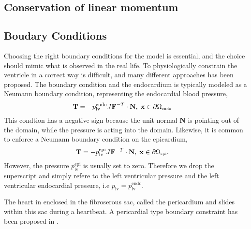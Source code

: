 

\subsection{Conservation of linear momentum}


\subsection{Boudary Conditions}
\label{sec:mech_boudary}
Choosing the right boundary conditions for the model is essential,
and the choice should mimic what is observed in the real life. To
physiologically constrain the ventricle in a correct way is difficult,
and many different approaches has been proposed.
The boundary condition and the endocardium is typically modeled as a
Neumann boundary condition, representing the endocardial blood
pressure,
\begin{align}
  \mathbf{T} &= -p_{\mathrm{lv}}^{\mathrm{endo}} J\mathbf{F}^{-T} \cdot \mathbf{N}, \;  \mathbf{x} \in \partial \Omega_{ \textnormal{\tiny \text{endo}}}
\end{align}
This condtion has a negative sign because the unit normal
$\mathbf{N}$ is pointing out of the domain, while the pressure is
acting into the domain. Likewise, it is common to enforce a
Neumann boundary condition on the epicardium,
\begin{align}
\mathbf{T} &= -p_{\mathrm{lv}}^{\mathrm{epi}} J\mathbf{F}^{-T} \cdot \mathbf{N}, \;  \mathbf{x} \in \partial \Omega_{ \textnormal{\tiny \text{epi}}}.
\end{align}
However, the pressure $p_{\mathrm{lv}}^{\mathrm{epi}}$ is usually set
to zero. Therefore we drop the superscript and simply refere to the
left ventricular pressure and the left ventricular endocardial
pressure, i.e $p_{\mathrm{lv}} = p_{\mathrm{lv}}^{\mathrm{endo}}$.

The heart in enclosed in the fibroserous sac, called the pericardium
and slides within this sac during a heartbeat. A pericardial type
boundary constraint has been proposed in
\cite{nash2000computational}.

